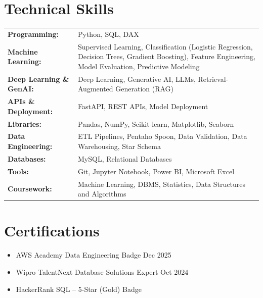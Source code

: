 \documentclass[a4paper,10pt]{article}
\begin{document}
\section{Technical Skills}
\begin{tabularx}{\linewidth}{@{}l X@{}}
\textbf{Programming:} & Python, SQL, DAX \\
\textbf{Machine Learning:} & Supervised Learning, Classification (Logistic Regression, Decision Trees, Gradient Boosting), Feature Engineering, Model Evaluation, Predictive Modeling \\
\textbf{Deep Learning \& GenAI:} & Deep Learning, Generative AI, LLMs, Retrieval-Augmented Generation (RAG) \\
\textbf{APIs \& Deployment:} & FastAPI, REST APIs, Model Deployment \\
\textbf{Libraries:} & Pandas, NumPy, Scikit-learn, Matplotlib, Seaborn \\
\textbf{Data Engineering:} & ETL Pipelines, Pentaho Spoon, Data Validation, Data Warehousing, Star Schema \\
\textbf{Databases:} & MySQL, Relational Databases \\
\textbf{Tools:} & Git, Jupyter Notebook, Power BI, Microsoft Excel \\
\textbf{Coursework:} & Machine Learning, DBMS, Statistics, Data Structures and Algorithms \\
\end{tabularx}

\section{Certifications}
\begin{itemize}[leftmargin=1em, itemsep=1pt, label=--, nosep]
    \item AWS Academy Data Engineering Badge \hfill Dec 2025
    \item Wipro TalentNext Database Solutions Expert \hfill Oct 2024
    \item HackerRank SQL -- 5-Star (Gold) Badge
\end{itemize}
\end{document}
